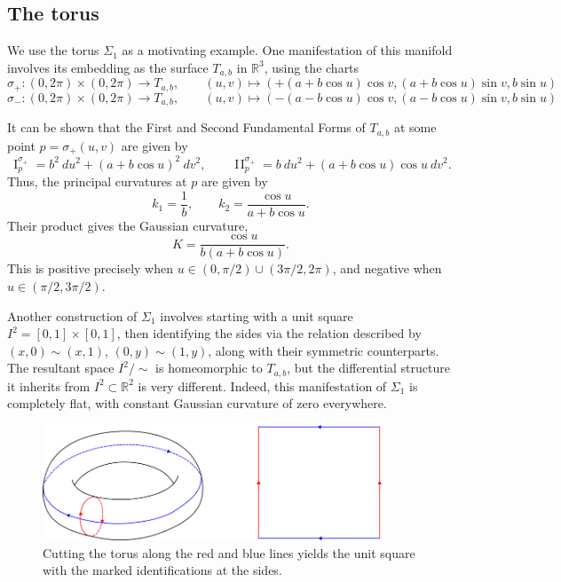 \documentclass[12pt]{article}
\newcommand{\R}{\mathbb{R}}
\theoremstyle{definition}
\theoremstyle{remark}
\begin{document}
    \subsection{The torus}

    We use the torus $\Sigma_1$ as a motivating example. One manifestation of this
    manifold involves its embedding as the surface $T_{a, b}$ in $\R^3$, using the
    charts \[
        \sigma_+\colon (0, 2\pi)\times (0, 2\pi) \to T_{a, b}, \qquad
        (u, v) \mapsto (+(a + b\cos{u})\cos{v}, (a + b\cos{u})\sin{v}, b\sin{u})
    \] \[
        \sigma_-\colon (0, 2\pi)\times (0, 2\pi) \to T_{a, b}, \qquad
        (u, v) \mapsto (-(a - b\cos{u})\cos{v}, (a - b\cos{u})\sin{v}, b\sin{u})
    \]

    It can be shown that the First and Second Fundamental Forms of $T_{a, b}$ at some point
    $p = \sigma_+(u, v)$ are given by \[
        \operatorname{I}^{\sigma_+}_p = b^2\:du^2 + (a + b\cos{u})^2\:dv^2, \qquad
        \operatorname{I\!I}^{\sigma_+}_p = b\:du^2 + (a + b\cos{u})\cos{u}\:dv^2.
    \] Thus, the principal curvatures at $p$ are given by \[
        k_1 = \frac{1}{b}, \qquad k_2 = \frac{\cos{u}}{a + b\cos{u}}.
    \] Their product gives the Gaussian curvature, \[
        K = \frac{\cos{u}}{b(a + b\cos{u})}.
    \] This is positive precisely when $u \in (0, \pi / 2) \cup (3\pi / 2, 2\pi)$,
    and negative when $u \in (\pi / 2, 3\pi / 2)$.


    Another construction of $\Sigma_1$ involves starting with a unit square $I^2 =
    [0, 1] \times [0, 1]$, then identifying the sides via the relation described by
    $(x, 0) \sim (x, 1)$, $(0, y) \sim (1, y)$, along with their symmetric
    counterparts. The resultant space $I^2 / \sim$ is homeomorphic to $T_{a, b}$, but
    the differential structure it inherits from $I^2 \subset \R^2$ is very different.
    Indeed, this manifestation of $\Sigma_1$ is completely flat, with constant
    Gaussian curvature of zero everywhere.


    \begin{figure}[H]
        \begin{center}
            \includegraphics[width=0.9\textwidth]{figures/torus_cut.png}
        \end{center}
        \caption{Cutting the torus along the red and blue lines yields the unit
        square with the marked identifications at the sides.}
        \label{fig:torus_cut}
    \end{figure}
\end{document}
